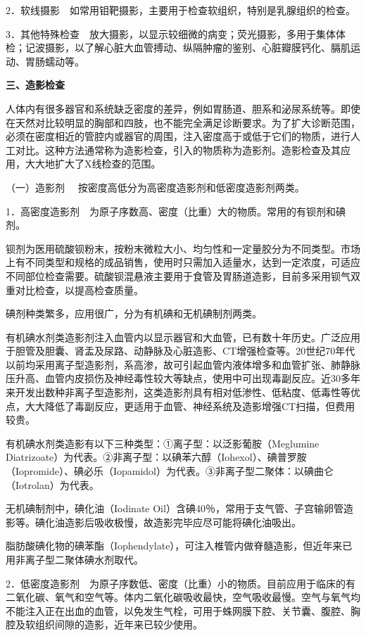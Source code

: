 2．软线摄影　如常用钼靶摄影，主要用于检查软组织，特别是乳腺组织的检查。

3．其他特殊检查　放大摄影，以显示较细微的病变；荧光摄影，多用于集体体检；记波摄影，以了解心脏大血管搏动、纵隔肿瘤的鉴别、心脏瓣膜钙化、膈肌运动、胃肠蠕动等。

\textbf{三、造影检查}

人体内有很多器官和系统缺乏密度的差异，例如胃肠道、胆系和泌尿系统等。即使在天然对比较明显的胸部和四肢，也不能完全满足诊断要求。为了扩大诊断范围，必须在密度相近的管腔内或器官的周围，注入密度高于或低于它们的物质，进行人工对比。这种方法通常称为造影检查，引入的物质称为造影剂。造影检查及其应用，大大地扩大了X线检查的范围。

（一）{造影剂} 　按密度高低分为高密度造影剂和低密度造影剂两类。

1．高密度造影剂　为原子序数高、密度（比重）大的物质。常用的有钡剂和碘剂。

钡剂为医用硫酸钡粉末，按粉末微粒大小、均匀性和一定量胶分为不同类型。市场上有不同类型和规格的成品销售，使用时只需加入适量水，达到一定浓度，可适应不同部位检查需要。硫酸钡混悬液主要用于食管及胃肠道造影，目前多采用钡气双重对比检查，以提高检查质量。

碘剂种类繁多，应用很广，分为有机碘和无机碘制剂两类。

有机碘水剂类造影剂注入血管内以显示器官和大血管，已有数十年历史。广泛应用于胆管及胆囊、肾盂及尿路、动静脉及心脏造影、CT增强检查等。20世纪70年代以前均采用离子型造影剂，系高渗，故可引起血管内液体增多和血管扩张、肺静脉压升高、血管内皮损伤及神经毒性较大等缺点，使用中可出现毒副反应。近30多年来开发出数种非离子型造影剂，这类造影剂具有相对低渗性、低粘度、低毒性等优点，大大降低了毒副反应，更适用于血管、神经系统及造影增强CT扫描，但费用较贵。

有机碘水剂类造影有以下三种类型：①离子型：以泛影葡胺（Meglumine
Diatrizoate）为代表。②非离子型：以碘苯六醇（Iohexol）、碘普罗胺（Iopromide）、碘必乐（Iopamidol）为代表。③非离子型二聚体：以碘曲仑（Iotrolan）为代表。

无机碘制剂中，碘化油（Iodinate
Oil）含碘40％，常用于支气管、子宫输卵管造影等。碘化油造影后吸收极慢，故造影完毕应尽可能将碘化油吸出。

脂肪酸碘化物的碘苯酯（Iophendylate），可注入椎管内做脊髓造影，但近年来已用非离子型二聚体碘水剂取代。

2．低密度造影剂　为原子序数低、密度（比重）小的物质。目前应用于临床的有二氧化碳、氧气和空气等。体内二氧化碳吸收最快，空气吸收最慢。空气与氧气均不能注入正在出血的血管，以免发生气栓，可用于蛛网膜下腔、关节囊、腹腔、胸腔及软组织间隙的造影，近年来已较少使用。

